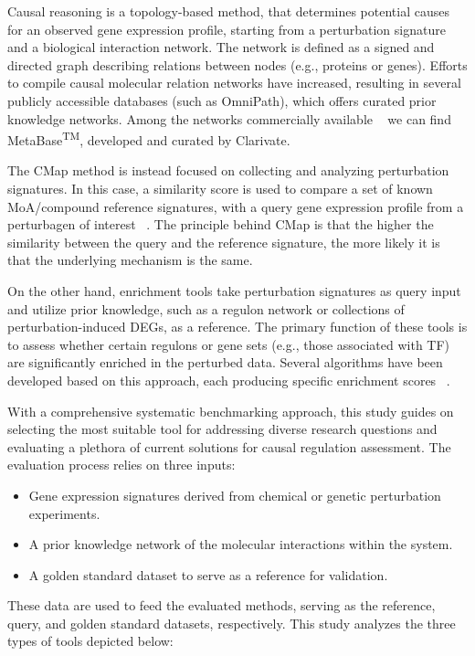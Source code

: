 Causal reasoning is a topology-based method, that determines potential causes for an observed gene expression profile, starting from a perturbation signature and a biological interaction network. 
The network is defined as a signed and directed graph describing relations between nodes (e.g., proteins or genes). 
Efforts to compile causal molecular relation networks have increased, resulting in several publicly accessible databases (such as OmniPath), which offers curated prior knowledge networks. 
Among the networks commercially available ~\cite{RN32} we can find MetaBase\textsuperscript{TM}, developed and curated by Clarivate.


The \gls{CMap} method is instead focused on collecting and analyzing perturbation signatures. 
In this case, a similarity score is used to compare a set of known MoA/compound reference signatures, with a query gene expression profile from a perturbagen of interest ~\cite{RN34, RN38}.
The principle behind \gls{CMap} is that the higher the similarity between the query and the reference signature, the more likely it is that the underlying mechanism is the same. 

On the other hand, enrichment tools take perturbation signatures as query input and utilize prior knowledge, such as a regulon network or collections of perturbation-induced \gls{DEGs}, as a reference. 
The primary function of these tools is to assess whether certain regulons or gene sets (e.g., those associated with \gls{TF}) are significantly enriched in the perturbed data. 
Several algorithms have been developed based on this approach, each producing specific enrichment scores ~\cite{RN35}.

With a comprehensive systematic benchmarking approach, this study guides on selecting the most suitable tool for addressing diverse research questions and evaluating a plethora of current solutions for causal regulation assessment. 
The evaluation process relies on three inputs:

\begin{itemize}
  \item Gene expression signatures derived from chemical or genetic perturbation experiments.
  \item A prior knowledge network of the molecular interactions within the system. 
  \item A golden standard dataset to serve as a reference for validation.
\end{itemize}

These data are used to feed the evaluated methods, serving as the reference, query, and golden standard datasets, respectively. 
This study analyzes the three types of tools depicted below: 

